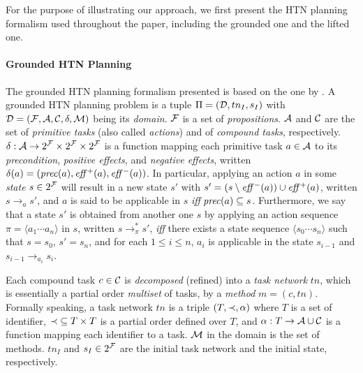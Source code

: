 For the purpose of illustrating our approach, we first present the HTN planning formalism used throughout the paper, including the grounded one and the lifted one. %

\paragraph{Grounded HTN Planning} The grounded HTN planning formalism presented is based on the one by . A grounded HTN planning problem is a tuple $\Pi{} = (\mathcal{D}{}, tn_{I}, s_{I})$ with $\mathcal{D}{} = (\mathcal{F}{}, \mathcal{A}{}, \mathcal{C}{}, \delta, \mathcal{M}{})$ being its \emph{domain}. $\mathcal{F}{}$ is a set of \emph{propositions}. $\mathcal{A}{}$ and $\mathcal{C}{}$ are the set of \emph{primitive tasks} (also called \emph{actions}) and of \emph{compound tasks}, respectively. $\delta: \mathcal{A}{} \to 2^{\mathcal{F}{}} \times 2^{\mathcal{F}{}} \times 2^{\mathcal{F}{}}$ is a function mapping each primitive task $a \in \mathcal{A}{}$ to its \emph{precondition}, \emph{positive effects}, and \emph{negative effects}, written $\delta(a) = (\mathit{prec}(a), \mathit{eff}{}^{+}(a), \mathit{eff}{}^{-}(a))$. In particular, applying an action $a$ in some \emph{state} $s \in 2^{\mathcal{F}{}}$ will result in a new state $s'$ with $s' = (s \setminus \mathit{eff}{}^{-}(a)) \cup \mathit{eff}{}^{+}(a)$, written $s \to_{a} s'$, and $a$ is said to be applicable in $s$ \emph{iff} $\mathit{prec}(a) \subseteq s$. Furthermore, we say that a state $s'$ is obtained from another one $s$ by applying an action sequence $\pi = \langle a_{1} \cdots a_{n} \rangle$ in $s$, written $s \to^{\ast}_{\pi} s'$, \emph{iff} there exists a state sequence $\langle s_{0} \cdots s_{n} \rangle$ such that $s = s_{0}$, $s' = s_{n}$, and for each $1 \leq i \leq n$, $a_{i}$ is applicable in the state $s_{i - 1}$ and $s_{i - 1} \to_{a_{i}} s_{i}$. 

Each compound task $c \in \mathcal{C}{}$ is \emph{decomposed} (refined) into a \emph{task network} $tn$, which is essentially a partial order \emph{multiset} of tasks, by a \emph{method} $m = (c, tn)$. Formally speaking, a task network $tn$ is a triple $(T, \mathord{\prec}{}, \alpha)$ where $T$ is a set of identifier, $\mathord{\prec}{} \subseteq T \times T$ is a partial order defined over $T$, and $\alpha: T \to \mathcal{A}{} \cup \mathcal{C}{}$ is a function mapping each identifier to a task. $\mathcal{M}{}$ in the domain is the set of methods. $tn_{I}$ and $s_{I} \in 2^{\mathcal{F}{}}$ are the initial task network and the initial state, respectively.

